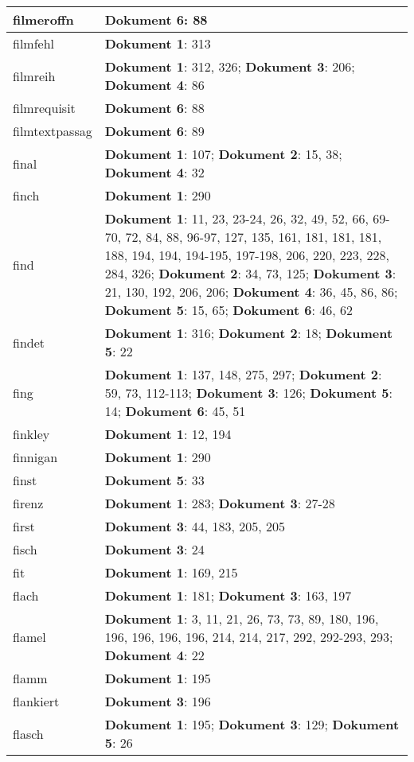 \documentclass[a5paper]{article}
\begin{document}
\begin{longtable}[l]{|l|p{3in}|}
\hline
filmeroffn & \textbf{Dokument 6}: 88 \\
\hline
filmfehl & \textbf{Dokument 1}: 313 \\
\hline
filmreih & \textbf{Dokument 1}: 312, 326; \textbf{Dokument 3}: 206; \textbf{Dokument 4}: 86 \\
\hline
filmrequisit & \textbf{Dokument 6}: 88 \\
\hline
filmtextpassag & \textbf{Dokument 6}: 89 \\
\hline
final & \textbf{Dokument 1}: 107; \textbf{Dokument 2}: 15, 38; \textbf{Dokument 4}: 32 \\
\hline
finch & \textbf{Dokument 1}: 290 \\
\hline
find & \textbf{Dokument 1}: 11, 23, 23-24, 26, 32, 49, 52, 66, 69-70, 72, 84, 88, 96-97, 127, 135, 161, 181, 181, 181, 188, 194, 194, 194-195, 197-198, 206, 220, 223, 228, 284, 326; \textbf{Dokument 2}: 34, 73, 125; \textbf{Dokument 3}: 21, 130, 192, 206, 206; \textbf{Dokument 4}: 36, 45, 86, 86; \textbf{Dokument 5}: 15, 65; \textbf{Dokument 6}: 46, 62 \\
\hline
findet & \textbf{Dokument 1}: 316; \textbf{Dokument 2}: 18; \textbf{Dokument 5}: 22 \\
\hline
fing & \textbf{Dokument 1}: 137, 148, 275, 297; \textbf{Dokument 2}: 59, 73, 112-113; \textbf{Dokument 3}: 126; \textbf{Dokument 5}: 14; \textbf{Dokument 6}: 45, 51 \\
\hline
finkley & \textbf{Dokument 1}: 12, 194 \\
\hline
finnigan & \textbf{Dokument 1}: 290 \\
\hline
finst & \textbf{Dokument 5}: 33 \\
\hline
firenz & \textbf{Dokument 1}: 283; \textbf{Dokument 3}: 27-28 \\
\hline
first & \textbf{Dokument 3}: 44, 183, 205, 205 \\
\hline
fisch & \textbf{Dokument 3}: 24 \\
\hline
fit & \textbf{Dokument 1}: 169, 215 \\
\hline
flach & \textbf{Dokument 1}: 181; \textbf{Dokument 3}: 163, 197 \\
\hline
flamel & \textbf{Dokument 1}: 3, 11, 21, 26, 73, 73, 89, 180, 196, 196, 196, 196, 196, 214, 214, 217, 292, 292-293, 293; \textbf{Dokument 4}: 22 \\
\hline
flamm & \textbf{Dokument 1}: 195 \\
\hline
flankiert & \textbf{Dokument 3}: 196 \\
\hline
flasch & \textbf{Dokument 1}: 195; \textbf{Dokument 3}: 129; \textbf{Dokument 5}: 26 \\

\end{longtable}
\end{document}
